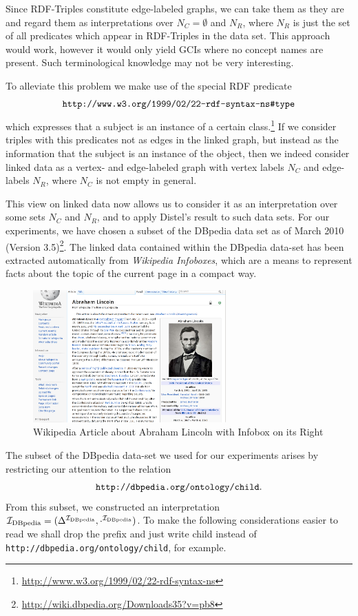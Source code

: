 Since RDF-Triples constitute edge-labeled graphs, we can take them as they are and regard
them as interpretations over $N_C = \emptyset$ and $N_R$, where $N_R$ is just the set of
all predicates which appear in RDF-Triples in the data set.  This approach would work,
however it would only yield GCIs where no concept names are present.  Such terminological
knowledge may not be very interesting.

To alleviate this problem we make use of the special RDF predicate
\begin{equation}
  \label{eq:16}
  \verb|http://www.w3.org/1999/02/22-rdf-syntax-ns#type|
\end{equation}
which expresses that a subject is an instance of a certain
class.\footnote{\url{http://www.w3.org/1999/02/22-rdf-syntax-ns}} If we consider triples
with this predicates not as edges in the linked graph, but instead as the information that
the subject is an instance of the object, then we indeed consider linked data as a vertex-
and edge-labeled graph with vertex labels $N_C$ and edge-labels $N_R$, where $N_C$ is not
empty in general.

This view on linked data now allows us to consider it as an interpretation over some sets
$N_C$ and $N_R$, and to apply Distel's result to such data sets.  For our experiments, we
have chosen a subset of the DBpedia data set as of March 2010 (Version
3.5)\footnote{\url{http://wiki.dbpedia.org/Downloads35?v=pb8}}.  The linked data contained
within the DBpedia data-set has been extracted automatically from \emph{Wikipedia
  Infoboxes}, which are a means to represent facts about the topic of the current page in
a compact way.

\begin{figure}[tp]
  \centering
  \includegraphics[width=20em]{chapters/lincoln-infobox.png}
  \caption{Wikipedia Article about Abraham Lincoln with Infobox on its Right}
  \label{fig:infobox-screenshot}
\end{figure}

The subset of the DBpedia data-set we used for our experiments arises by restricting our
attention to the relation
\begin{equation*}
  \verb|http://dbpedia.org/ontology/child|.
\end{equation*}
From this subset, we constructed an interpretation ${\mathcal{I}_{\text{DBpedia}}} = (\Delta^{{\mathcal{I}_{\text{DBpedia}}}},
\cdot^{{\mathcal{I}_{\text{DBpedia}}}})$.  To make the following considerations easier to read we shall drop
the prefix and just write \textsf{child} instead of
\texttt{http://dbpedia.org/ontology/child}, for example.

